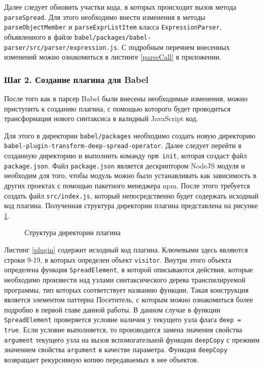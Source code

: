 \documentclass[14pt, a4paper]{article}
\def\code#1{\texttt{#1}} %
\begin{document}
Далее следует обновить участки кода, в которых происходит вызов метода \code{parseSpread}. Для этого
необходимо внести изменения в методы \code{parseObjectMember} и \code{parseExprListItem} класса \code{ExpressionParser},
\linebreak объявленного в файле \code{babel/packages/babel-parser/src/parser\linebreak/expression.js}.
С подробным перечнем внесенных изменений можно ознакомиться в листинге \ref{parseCall} в приложении.

\subsubsection*{Шаг 2. Создание плагина для Babel}
После того как в парсер Babel были внесены необходимые изменения, можно приступить к созданию плагина,
с помощью которого будет проводиться трансформация нового синтаксиса в валидный JavaScript код.

Для этого в директории \code{babel/packages} необходимо создать новую директорию \code{babel-plugin-transform-deep-spread-operator}.
Далее следует перейти в созданную директорию и выполнить команду \code{npm init}, которая создаст
файл \code{package.json}. Файл \code{package.json} является дескриптором NodeJS модуля и необходим 
для того, чтобы модуль можно было устанавливать как зависимость в других проектах с помощью пакетного
менеджера npm. После этого требуется создать файл \code{src/index.js}, который непосредственно будет 
содержать исходный код плагина. Полученная структура директории плагина представлена на рисунке \ref{babel_plugin_dirs}.

\begin{figure}[H]
  \centering
  \caption{Структура директории плагина}
  \label{babel_plugin_dirs}
  \end{figure}

Листинг \ref{plugin} содержит исходный код плагина. Ключевыми здесь являются строки 9-19, в которых определен 
объект \code{visitor}. Внутри этого объекта определена функция \code{SpreadElement}, в которой описываются
действия, которые необходимо произвести над узлами синтаксического дерева транспилируемой программы, 
тип которых соответствует названию функции. Такая конструкция является элементом паттерна Посетитель, с которым 
можно ознакомиться более подробно в первой главе данной работы. В данном случае в функции \code{SpreadElement}
проверяется условие наличия у текущего узла флага \code{deep = true}. Если условие выполняется, то 
производится замена значения свойства \code{argument} текущего узла на вызов вспомогательной функции \code{deepCopy} 
с прежним значением свойства \code{argument} в качестве параметра. 
Функция \code{deepCopy} возвращает рекурсивную копию передаваемых в нее объектов.
\end{document}
